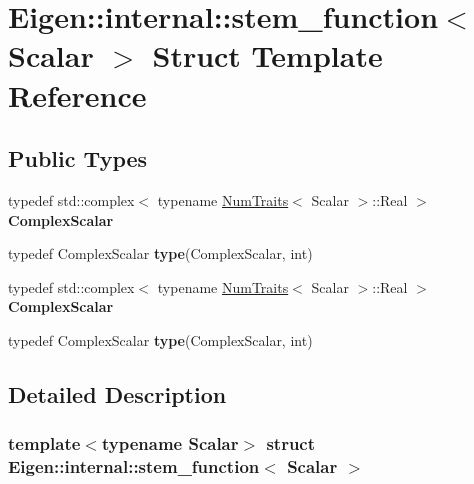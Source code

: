 \hypertarget{struct_eigen_1_1internal_1_1stem__function}{}\section{Eigen\+:\+:internal\+:\+:stem\+\_\+function$<$ Scalar $>$ Struct Template Reference}
\label{struct_eigen_1_1internal_1_1stem__function}
\subsection*{Public Types}
\begin{DoxyCompactItemize}
\item 
\mbox{\label{struct_eigen_1_1internal_1_1stem__function_a4cb6ecae530bb609c00fb2a40ab41e97}} 
typedef std\+::complex$<$ typename \hyperlink{group___core___module_struct_eigen_1_1_num_traits}{Num\+Traits}$<$ Scalar $>$\+::Real $>$ {\bfseries Complex\+Scalar}
\item 
\mbox{\label{struct_eigen_1_1internal_1_1stem__function_a091a1081100e894c221d75ac3ea614d4}} 
typedef Complex\+Scalar {\bfseries type}(Complex\+Scalar, int)
\item 
\mbox{\label{struct_eigen_1_1internal_1_1stem__function_a4cb6ecae530bb609c00fb2a40ab41e97}} 
typedef std\+::complex$<$ typename \hyperlink{group___core___module_struct_eigen_1_1_num_traits}{Num\+Traits}$<$ Scalar $>$\+::Real $>$ {\bfseries Complex\+Scalar}
\item 
\mbox{\label{struct_eigen_1_1internal_1_1stem__function_a091a1081100e894c221d75ac3ea614d4}} 
typedef Complex\+Scalar {\bfseries type}(Complex\+Scalar, int)
\end{DoxyCompactItemize}


\subsection{Detailed Description}
\subsubsection*{template$<$typename Scalar$>$\newline
struct Eigen\+::internal\+::stem\+\_\+function$<$ Scalar $>$}



